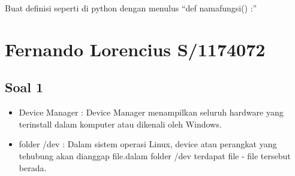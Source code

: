 Buat definisi seperti di python dengan menulus “def namafungsi() :”



\section{Fernando Lorencius S/1174072}
	\subsection{Soal 1} 
		\begin{itemize}
			\item Device Manager : Device Manager menampilkan seluruh hardware yang terinstall dalam komputer atau dikenali oleh Windows.

			\item folder /dev : Dalam sistem operasi Linux, device atau perangkat yang tehubung akan dianggap file.dalam folder /dev terdapat file - file  tersebut berada.
		\end{itemize}

